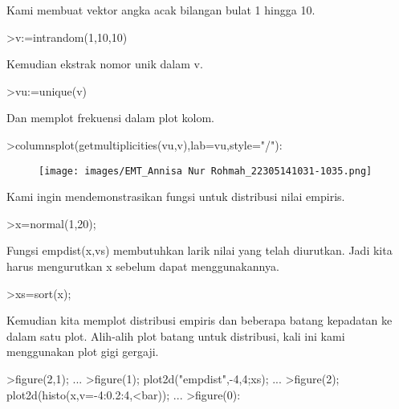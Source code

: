 \documentclass[a4paper,10pt]{article}
\begin{document}
\begin{eulernotebook}
\begin{eulercomment}
\begin{eulercomment}
\begin{eulercomment}
\begin{eulercomment}
\begin{eulercomment}
Kami membuat vektor angka acak bilangan bulat 1 hingga 10.
\end{eulercomment}
\begin{eulerprompt}
>v:=intrandom(1,10,10)
\end{eulerprompt}
\begin{euleroutput}
  [8,  5,  8,  8,  6,  8,  8,  3,  5,  5]
\end{euleroutput}
\begin{eulercomment}
Kemudian ekstrak nomor unik dalam v.
\end{eulercomment}
\begin{eulerprompt}
>vu:=unique(v)
\end{eulerprompt}
\begin{euleroutput}
  [3,  5,  6,  8]
\end{euleroutput}
\begin{eulercomment}
Dan memplot frekuensi dalam plot kolom.
\end{eulercomment}
\begin{eulerprompt}
>columnsplot(getmultiplicities(vu,v),lab=vu,style="/"):
\end{eulerprompt}
\begin{figure}[h]
    \centering
    \texttt{[image: images/EMT\_Annisa Nur Rohmah\_22305141031-1035.png]}
\end{figure}
\begin{eulercomment}
Kami ingin mendemonstrasikan fungsi untuk distribusi nilai empiris.
\end{eulercomment}
\begin{eulerprompt}
>x=normal(1,20);
\end{eulerprompt}
\begin{eulercomment}
Fungsi empdist(x,vs) membutuhkan larik nilai yang telah diurutkan.
Jadi kita harus mengurutkan x sebelum dapat menggunakannya.
\end{eulercomment}
\begin{eulerprompt}
>xs=sort(x);
\end{eulerprompt}
\begin{eulercomment}
Kemudian kita memplot distribusi empiris dan beberapa batang kepadatan
ke dalam satu plot. Alih-alih plot batang untuk distribusi, kali ini
kami menggunakan plot gigi gergaji.
\end{eulercomment}
\begin{eulerprompt}
>figure(2,1); ...
>figure(1); plot2d("empdist",-4,4;xs); ...
>figure(2); plot2d(histo(x,v=-4:0.2:4,<bar));  ...
>figure(0):
\end{eulerprompt}

\end{eulercomment}
\end{eulercomment}
\end{eulercomment}
\end{eulercomment}
\end{eulernotebook}
\end{document}

